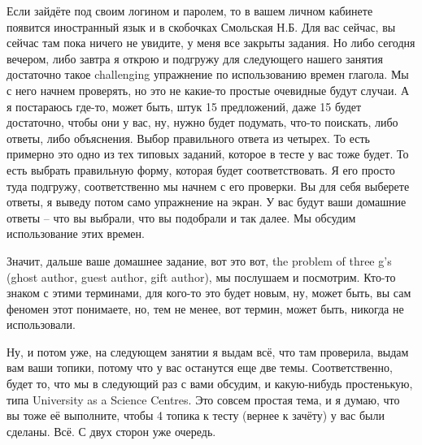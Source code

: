 \documentclass[main.tex]{subfiles}
\begin{document}
Если зайдёте под своим логином и паролем, то в вашем личном кабинете появится иностранный язык и в скобочках Смольская Н.Б.
Для вас сейчас, вы сейчас там пока ничего не увидите, у меня все закрыты задания.
Но либо сегодня вечером, либо завтра я открою и подгружу для следующего нашего занятия достаточно такое challenging упражнение по использованию времен глагола.
Мы с него начнем проверять, но это не какие-то простые очевидные будут случаи.
А я постараюсь где-то, может быть, штук 15 предложений, даже 15 будет достаточно, чтобы они у вас, ну, нужно будет подумать, что-то поискать, либо ответы, либо объяснения.
Выбор правильного ответа из четырех.
То есть примерно это одно из тех типовых заданий, которое в тесте у вас тоже будет.
То есть выбрать правильную форму, которая будет соответствовать.
Я его просто туда подгружу, соответственно мы начнем с его проверки.
Вы для себя выберете ответы, я выведу потом само упражнение на экран.
У вас будут ваши домашние ответы -- что вы выбрали, что вы подобрали и так далее.
Мы обсудим использование этих времен.

Значит, дальше ваше домашнее задание, вот это вот, the problem of three g's (ghost author, guest author, gift author), мы послушаем и посмотрим.
Кто-то знаком с этими терминами, для кого-то это будет новым, ну, может быть, вы сам феномен этот понимаете, но, тем не менее, вот термин, может быть, никогда не использовали.

Ну, и потом уже, на следующем занятии я выдам всё, что там проверила, выдам вам ваши топики, потому что у вас останутся еще две темы.
Соответственно, будет то, что мы в следующий раз с вами обсудим, и какую-нибудь простенькую, типа University as a Science Centres.
Это совсем простая тема, и я думаю, что вы тоже её выполните, чтобы 4 топика к тесту (вернее к зачёту) у вас были сделаны.
Всё.
С двух сторон уже очередь.
\end{document}
